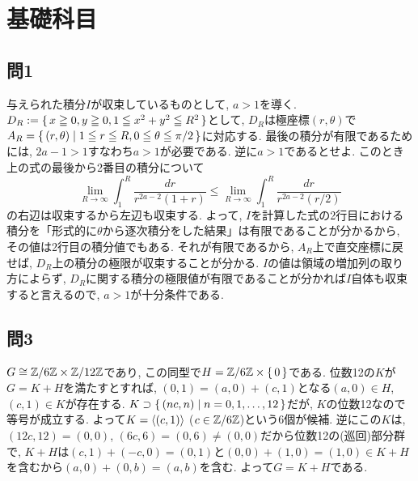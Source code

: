 \section{基礎科目}
\subsection{問1}
与えられた積分$I$が収束しているものとして, $a>1$を導く.
$D_{R} := \set{x\geqq0, y\geqq0, 1\leqq x^2+y^2\leqq R^2 }$として, $D_R$は極座標$(r,\theta)$で$A_R = \set{(r,\theta)\mid 1\leqq r\leqq R, 0\leqq\theta \leqq\pi/2}$に対応する.
最後の積分が有限であるためには, $2a-1 > 1$すなわち$a>1$が必要である. 逆に$a>1$であるとせよ. このとき上の式の最後から2番目の積分について
\[\lim_{R\to \infty} \int_{1}^{R} \dfrac{dr}{r^{2a-2}(1+r)}\leq \lim_{R\to \infty} \int_{1}^{R} \dfrac{dr}{r^{2a-2}(r/2)}  \]
の右辺は収束するから左辺も収束する. よって, $I$を計算した式の2行目における積分を「形式的に$\theta$から逐次積分をした結果」は有限であることが分かるから, その値は2行目の積分値でもある. それが有限であるから, $A_R$上で直交座標に戻せば, $D_R$上の積分の極限が収束することが分かる. $I$の値は領域の増加列の取り方によらず, $D_R$に関する積分の極限値が有限であることが分かれば$I$自体も収束すると言えるので, $a>1$が十分条件である.



\subsection{問3}
$G\cong \mathbb{Z}/6\mathbb{Z}\times \mathbb{Z}/12\mathbb{Z}$であり, この同型で$H = \mathbb{Z}/6\mathbb{Z}\times \set{0}$である. 位数12の$K$が$G=K+H$を満たすとすれば, $(0,1) = (a,0) + (c,1)$となる$(a,0)\in H$, $(c,1)\in K$が存在する. $K\supset \set{(nc,n)\mid n=0,1,\dots,12}$だが, $K$の位数12なので等号が成立する. よって$K=\langle (c,1)\rangle$ ($c\in \mathbb{Z}/6\mathbb{Z}$)という6個が候補.  逆にこの$K$は, $(12c, 12) = (0,0)$, $(6c,6) = (0,6)\neq (0,0)$だから位数12の(巡回)部分群で, $K+H$は$(c,1) + (-c,0) = (0,1)$と$(0,0) + (1,0) = (1,0)\in K + H$を含むから$(a,0) + (0,b) = (a,b)$を含む. よって$G=K+H$である.


